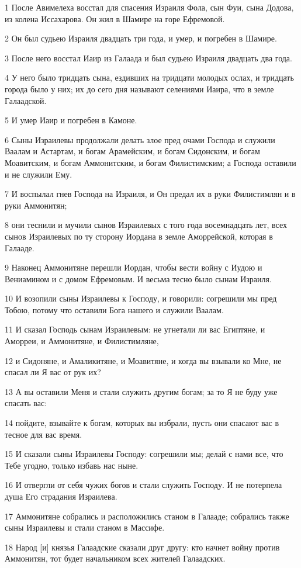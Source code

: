 \par 1 После Авимелеха восстал для спасения Израиля Фола, сын Фуи, сына Додова, из колена Иссахарова. Он жил в Шамире на горе Ефремовой.
\par 2 Он был судьею Израиля двадцать три года, и умер, и погребен в Шамире.
\par 3 После него восстал Иаир из Галаада и был судьею Израиля двадцать два года.
\par 4 У него было тридцать сына, ездивших на тридцати молодых ослах, и тридцать города было у них; их до сего дня называют селениями Иаира, что в земле Галаадской.
\par 5 И умер Иаир и погребен в Камоне.
\par 6 Сыны Израилевы продолжали делать злое пред очами Господа и служили Ваалам и Астартам, и богам Арамейским, и богам Сидонским, и богам Моавитским, и богам Аммонитским, и богам Филистимским; а Господа оставили и не служили Ему.
\par 7 И воспылал гнев Господа на Израиля, и Он предал их в руки Филистимлян и в руки Аммонитян;
\par 8 они теснили и мучили сынов Израилевых с того года восемнадцать лет, всех сынов Израилевых по ту сторону Иордана в земле Аморрейской, которая в Галааде.
\par 9 Наконец Аммонитяне перешли Иордан, чтобы вести войну с Иудою и Вениамином и с домом Ефремовым. И весьма тесно было сынам Израиля.
\par 10 И возопили сыны Израилевы к Господу, и говорили: согрешили мы пред Тобою, потому что оставили Бога нашего и служили Ваалам.
\par 11 И сказал Господь сынам Израилевым: не угнетали ли вас Египтяне, и Аморреи, и Аммонитяне, и Филистимляне,
\par 12 и Сидоняне, и Амаликитяне, и Моавитяне, и когда вы взывали ко Мне, не спасал ли Я вас от рук их?
\par 13 А вы оставили Меня и стали служить другим богам; за то Я не буду уже спасать вас:
\par 14 пойдите, взывайте к богам, которых вы избрали, пусть они спасают вас в тесное для вас время.
\par 15 И сказали сыны Израилевы Господу: согрешили мы; делай с нами все, что Тебе угодно, только избавь нас ныне.
\par 16 И отвергли от себя чужих богов и стали служить Господу. И не потерпела душа Его страдания Израилева.
\par 17 Аммонитяне собрались и расположились станом в Галааде; собрались также сыны Израилевы и стали станом в Массифе.
\par 18 Народ [и] князья Галаадские сказали друг другу: кто начнет войну против Аммонитян, тот будет начальником всех жителей Галаадских.

